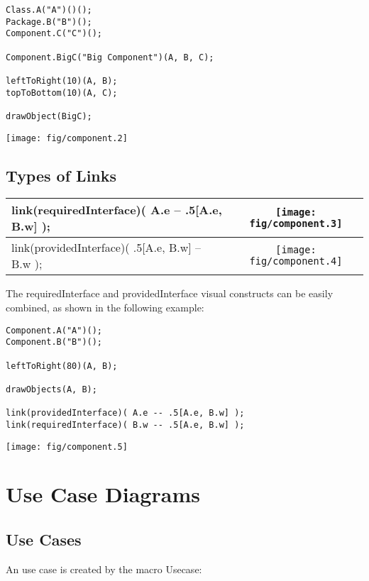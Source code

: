 \documentclass{article}
\newcommand{\code}{\ttfamily}
\begin{document}
\begin{multicols}{2}
\begin{verbatim}
Class.A("A")()();
Package.B("B")();
Component.C("C")();

Component.BigC("Big Component")(A, B, C);

leftToRight(10)(A, B);
topToBottom(10)(A, C);

drawObject(BigC);
\end{verbatim}
\columnbreak
\hspace{3cm}\texttt{[image: fig/component.2]}
\end{multicols}

\subsection{Types of Links}

\begin{tabular}{||l|c||}
\hline
{\code link(requiredInterface)( A.e -- .5[A.e, B.w] );} & \texttt{[image: fig/component.3]} \\
\hline
{\code link(providedInterface)( .5[A.e, B.w] -- B.w );} & \texttt{[image: fig/component.4]} \\
\hline
\end{tabular}

\vspace{0.5cm}

The {\code requiredInterface} and {\code providedInterface} visual constructs can be easily combined, as shown in the following example:

\begin{multicols}{2}
\begin{verbatim}
Component.A("A")();
Component.B("B")();

leftToRight(80)(A, B);

drawObjects(A, B);

link(providedInterface)( A.e -- .5[A.e, B.w] );
link(requiredInterface)( B.w -- .5[A.e, B.w] );
\end{verbatim}
\columnbreak
\hspace{-1cm}\texttt{[image: fig/component.5]}
\end{multicols}


\section{Use Case Diagrams}

\subsection{Use Cases}
An use case is created by the macro {\code Usecase}:
\end{document}
